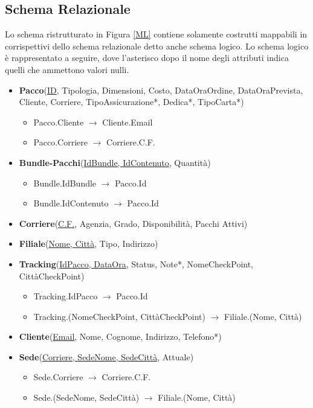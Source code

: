 \subsection{Schema Relazionale}
Lo schema ristrutturato in Figura \ref{ML} contiene solamente costrutti mappabili in corrispettivi dello schema relazionale detto anche schema logico. Lo schema logico è rappresentato a seguire, dove l'asterisco dopo il nome degli attributi indica quelli che ammettono valori nulli.
\begin{itemize}
    \setlength{\itemindent}{+0in}
    \item \textbf{Pacco}(\underline{ID}, Tipologia, Dimensioni, Costo, DataOraOrdine, DataOraPrevista, Cliente, Corriere, TipoAssicurazione*, Dedica*, TipoCarta*)
        \begin{itemize}
            \setlength{\itemindent}{+.2in}
            \item Pacco.Cliente $\rightarrow$ Cliente.Email 
            \item Pacco.Corriere $\rightarrow$ Corriere.C.F.
        \end{itemize}
    \item \textbf{Bundle-Pacchi}(\underline{IdBundle, IdContenuto}, Quantità)
        \begin{itemize}
            \setlength{\itemindent}{+.2in}
            \item Bundle.IdBundle $\rightarrow$ Pacco.Id 
            \item Bundle.IdContenuto $\rightarrow$ Pacco.Id
        \end{itemize}
        
    \item \textbf{Corriere}(\underline{C.F.}, Agenzia, Grado, Disponibilità, Pacchi Attivi)
    \item \textbf{Filiale}(\underline{Nome, Città}, Tipo, Indirizzo)
    \item \textbf{Tracking}(\underline{IdPacco, DataOra}, Status, Note*, NomeCheckPoint,\\CittàCheckPoint)
        \begin{itemize}
                \setlength{\itemindent}{+.2in}
                \item Tracking.IdPacco $\rightarrow$ Pacco.Id
                \item Tracking.(NomeCheckPoint, CittàCheckPoint) $\rightarrow$ Filiale.(Nome, Città)
        \end{itemize}
    \item \textbf{Cliente}(\underline{Email}, Nome, Cognome, Indirizzo, Telefono*)
     \item \textbf{Sede}(\underline{Corriere, SedeNome, SedeCittà}, Attuale)
        \begin{itemize}
            \setlength{\itemindent}{+.2in}
            \item Sede.Corriere $\rightarrow$ Corriere.C.F.
            \item Sede.(SedeNome, SedeCittà) $\rightarrow$ Filiale.(Nome, Città)
        \end{itemize}
     
\end{itemize}

